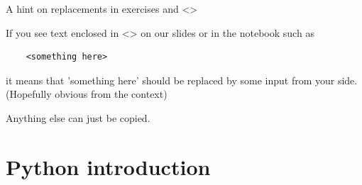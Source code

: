 \begin{frame}[fragile]{A hint on replacements in exercises and <>}
	
	If you see text enclosed in <> on our slides or in the notebook such as
	\begin{verbatim}
	<something here>
	\end{verbatim}
	it means that 'something here' should be replaced by some input from your side. (Hopefully obvious from the context)
	
	Anything else can just be copied.

\end{frame}



\section{Python introduction}


